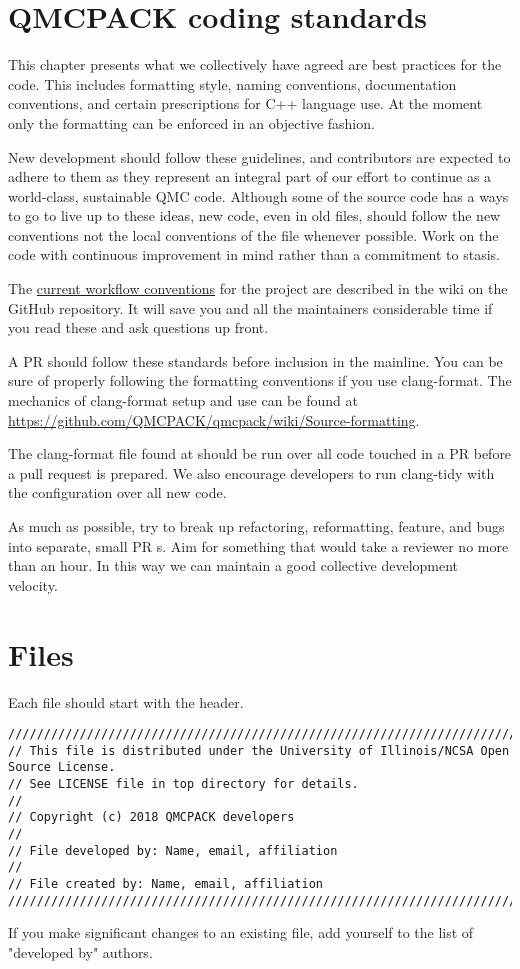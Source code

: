\section{QMCPACK coding standards}

This chapter presents what we collectively have agreed are best practices for the code. This includes formatting style, naming conventions, documentation conventions, and certain prescriptions for C++ language use. At the moment only the formatting can be enforced in an objective fashion.

New development should follow these guidelines, and contributors are expected to adhere to them as they represent an integral part of our effort to continue \qmcpack as a world-class, sustainable QMC code. Although some of the source code has a ways to go to live up to these ideas, new code, even in old files, should follow the new conventions not the local conventions of the file whenever possible. Work on the code with continuous improvement in mind rather than a commitment to stasis.

The \href{https://github.com/QMCPACK/qmcpack/wiki/Development-workflow}{current workflow conventions} for the project are described in the wiki on the GitHub repository. It will save you and all the maintainers considerable time if you read these and ask questions up front.

A PR should follow these standards before inclusion in the mainline. You can be sure of properly following the formatting conventions if you use clang-format.  The mechanics of clang-format setup and use can be found at \url{https://github.com/QMCPACK/qmcpack/wiki/Source-formatting}.

The clang-format file found at  should be run over all code touched in a PR before a pull request is prepared. We also encourage developers to run clang-tidy with the  configuration over all new code.

As much as possible, try to break up refactoring, reformatting, feature, and bugs into separate, small PR                                                                              s. Aim for something that would take a reviewer no more than an hour. In this way we can maintain a good collective development velocity.

\section{Files}
Each file should start with the header.
\lstset{language=C++,style=C++}
\begin{lstlisting}
//////////////////////////////////////////////////////////////////////////////////////
// This file is distributed under the University of Illinois/NCSA Open Source License.
// See LICENSE file in top directory for details.
//
// Copyright (c) 2018 QMCPACK developers
//
// File developed by: Name, email, affiliation
//
// File created by: Name, email, affiliation
//////////////////////////////////////////////////////////////////////////////////////
\end{lstlisting}
If you make significant changes to an existing file, add yourself to the list of "developed by" authors.

